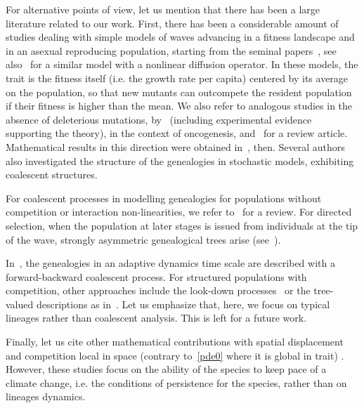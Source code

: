\documentclass[AHL,Unicode,longabstracts,published]{cedram}
\begin{document}
\vspace{6pt}

For alternative points of view, let us mention that there has been a large literature related to our work. First, there has been a considerable amount of studies dealing with simple models of waves advancing in a fitness landscape and in an asexual reproducing population, starting from the seminal papers~\cite{kessler_evolution_1997,tsimring_rna_1996}, see also~\cite{rouzine_solitary_2003} for a similar model with a nonlinear diffusion operator. In these models, the trait is the fitness itself (i.e. the growth rate per capita) centered by its average on the population, so that new mutants can outcompete the resident population if their fitness is higher than the mean. We also refer to analogous studies in the absence of deleterious mutations, by~\cite{desai_speed_2007} (including experimental evidence supporting the theory), \cite{beerenwinkel_genetic_2007} in the context of oncogenesis, and~\cite{park_speed_2010} for a review article. Mathematical results in this direction were obtained in~\cite{durrett_traveling_2011}, then\linebreak \cite{schweinsberg_rigorous_2017}. Several authors also investigated the structure of the genealogies in stochastic models, exhibiting coalescent structures.

For coalescent processes in modelling genealogies for populations without competition or interaction non-linearities, we refer to~\cite{berestycki_recent_nodate} for a review. For directed selection, when the population at later stages is issued from individuals at the tip of the wave, strongly asymmetric genealogical trees arise (see~\cite{berestyckiberestyckischweinsberg,brunet_effect_2007, brunet_genealogies_2013, desai_genetic_2013, neher_genealogies_2013,schweinsberg_rigorous_2017-1}).

In~\cite{lepersbilliardportemeleardtran}, the genealogies in an adaptive dynamics time scale are described with a forward-backward coalescent process. For structured populations with competition, other approaches include the look-down processes~\cite{donnellykurtz_96,donnellykurtz_99,etheridgekurtz} or the tree-valued descriptions as in~\cite{blancasbenitezguflerkliemtranwakolbinger,grevenpfaffelhuberwinter2009,kliemwinter}. Let us emphasize that, here, we focus on typical lineages rather than coalescent analysis. This is left for a future work.

Finally, let us cite other mathematical contributions with spatial displacement and competition local in space (contrary to~\eqref{pde0} where it is global in trait) \cite{alfaro_effect_2017,berestycki_can_2009,loarie_velocity_2009, potapov_climate_2004}. However, these studies focus on the ability of the species to keep pace of a climate change, i.e. the conditions of persistence for the species, rather than on lineages dynamics.
\end{document}
